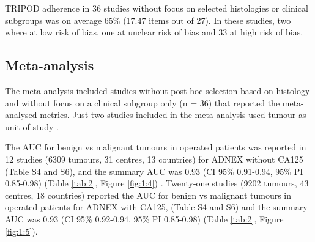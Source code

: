 \gls{TRIPOD} adherence in 36 studies without focus on selected histologies or clinical
subgroups was on average 65\% (17.47 items out of 27). In these studies, two
where at low risk of bias, one at unclear risk of bias and 33 at high risk of
bias.

\subsection{Meta-analysis}
The meta-analysis included studies without post hoc selection based on histology
and without focus on a clinical subgroup only (n = 36) that reported the
meta-analysed metrics. Just two studies included in the meta-analysis used
tumour as unit of study
 \cite{behnamfarComparisonUltrasoundTumor2022,esquivelvillabonaTwoStepStrategyOptimizing2022}.

The \gls{AUC} for benign vs malignant tumours in operated patients was reported in 12
studies (6309 tumours, 31 centres, 13 countries) for \gls{ADNEX} without CA125 (Table
S4 and S6), and the summary \gls{AUC} was 0.93 (\gls{CI} 95\% 0.91-0.94, 95\% \gls{PI} 0.85-0.98)
(Table \ref{tab:2}, Figure \ref{fig:1:4})
 \cite{vancalsterValidationModelsDiagnose2020,chenComparisonORADSADNEX2022,
  diazOvarianTumorsRisk2017a,heEstimatingRiskMalignancy2021,
  hiettPerformanceIOTASimple2022,lamhuongOptimalCutOffPoint2022,
  pelayoComparisonUltrasoundScores2023,pengEvaluationDiagnosticValue2021,
  poonyakanokPreoperativeEvaluationADNEX2021,
  qianComparisonDiagnosticPerformances2021,
  sayasnehEvaluatingRiskOvarian2016,
  zhangExternalValidationAssessment2022}.
Twenty-one studies (9202 tumours, 43 centres, 18 countries) reported the \gls{AUC} for
benign vs malignant tumours in operated patients for \gls{ADNEX} with CA125,
 \cite{vancalsterValidationModelsDiagnose2020,araujoPerformanceIOTAADNEX2017,
  behnamfarComparisonUltrasoundTumor2022,chenPerformanceIOTAADNEX2019,
  diazOvarianTumorsRisk2017a,heEstimatingRiskMalignancy2021,
  joyeuxSurgeryPredictabilityMalignant2016,
  lamhuongOptimalCutOffPoint2022,meysEstimatingRiskMalignancy2017,
  namAssessmentDifferentNEoplasias2021,pengEvaluationDiagnosticValue2021,
  poonyakanokPreoperativeEvaluationADNEX2021,
  qianComparisonDiagnosticPerformances2021,
  sayasnehEvaluatingRiskOvarian2016,stukanDevelopmentValidationModel2019,
  szubertPerformanceSelectedModels2020,szubertExternalValidationIOTA2016,
  tugPreoperativeDiscriminatingPerformance2020,vioraADNEXModelTriage2020,
  yangPerformanceIOTAADNEX2022,zhangExternalValidationAssessment2022}
(Table S4 and S6) and the summary \gls{AUC} was 0.93 (\gls{CI} 95\% 0.92-0.94, 95\% \gls{PI}
0.85-0.98) (Table \ref{tab:2}, Figure \ref{fig:1:5}).

